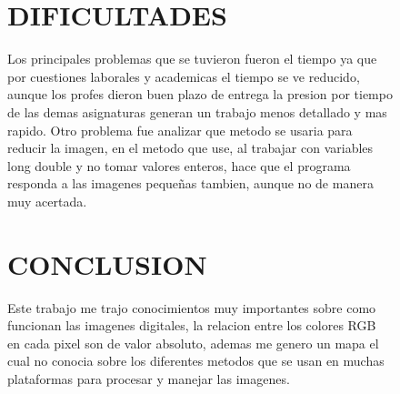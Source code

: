 \documentclass{article}
\begin{document}
\begin{figure} 
\section{DIFICULTADES}
Los principales problemas que se tuvieron fueron el tiempo ya que por cuestiones laborales y academicas el tiempo se ve reducido, aunque los profes dieron buen plazo de entrega la presion por tiempo de las demas asignaturas generan un trabajo menos detallado y mas rapido.
Otro problema fue analizar que metodo se usaria para reducir la imagen, en el metodo que use, al trabajar con variables long double y no tomar valores enteros, hace que el programa responda a las imagenes pequeñas tambien, aunque no de manera muy acertada.
\end{figure}

\begin{figure} 
\section{CONCLUSION}
Este trabajo me trajo conocimientos muy importantes sobre como funcionan las imagenes digitales, la relacion entre los colores RGB en cada pixel son de valor absoluto, ademas me genero un mapa el cual no conocia sobre los diferentes metodos que se usan en muchas plataformas para procesar y manejar las imagenes.
\end{figure}

\begin{figure}  


\end{figure}  
\end{document}

